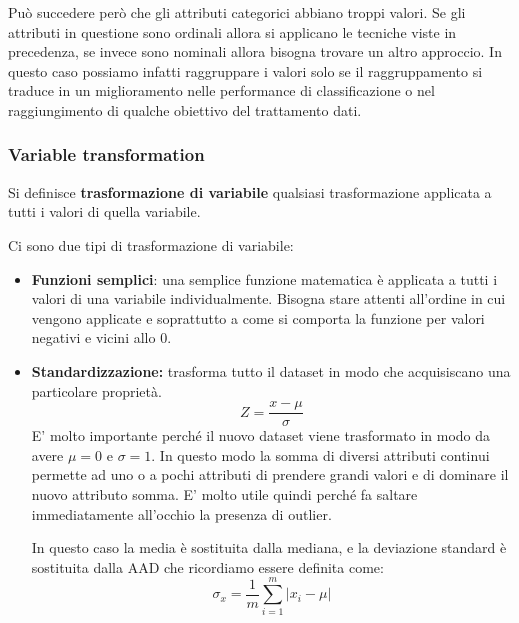  
 Può succedere però che gli attributi categorici abbiano troppi valori. Se gli attributi  in questione sono ordinali allora si applicano le tecniche viste in precedenza, se invece sono nominali allora bisogna trovare un altro approccio. In questo caso possiamo infatti raggruppare i valori solo se il raggruppamento si traduce in un miglioramento nelle performance di classificazione o nel raggiungimento di qualche obiettivo del trattamento dati. 
\subsubsection{Variable transformation}

\begin{defn}
Si definisce \textbf{trasformazione di variabile} qualsiasi trasformazione applicata a tutti i valori di quella variabile.
\end{defn}

Ci sono due tipi di trasformazione di variabile:
\begin{itemize}
	\item \textbf{Funzioni semplici}: una semplice funzione matematica è applicata a tutti i valori di una variabile individualmente. Bisogna stare attenti all'ordine in cui vengono applicate e soprattutto a come si comporta la funzione per valori negativi e vicini allo 0.
	\item \textbf{Standardizzazione:} trasforma tutto il dataset in modo che acquisiscano una particolare proprietà.
	\[Z = \frac{x - \mu}{\sigma}\]
	E' molto importante perché il nuovo dataset viene trasformato in modo da avere $\mu = 0$ e $\sigma = 1$. In questo modo la somma di diversi attributi continui permette ad uno o a pochi attributi di prendere grandi valori e di dominare il nuovo attributo somma. E' molto utile quindi perché fa saltare immediatamente all'occhio la presenza di outlier.
	
	In questo caso la media è sostituita dalla mediana, e la deviazione standard è sostituita dalla AAD che ricordiamo essere definita come:
	\[\sigma_{x} = \frac{1}{m} \sum_{i = 1}^{m}|x_{i}- \mu|\]
\end{itemize}
